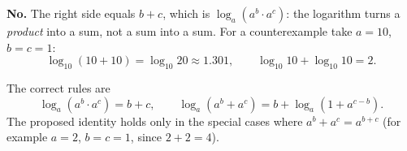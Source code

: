 \textbf{No.} The right side equals $b+c$, which is $\log_a\left(a^b\cdot a^c\right)$: the logarithm turns a \emph{product} into a sum, not a sum into a sum. For a counterexample take $a=10$, $b=c=1$:
\[
\log_{10}(10+10)=\log_{10}20\approx1.301,\qquad \log_{10}10+\log_{10}10=2 .
\]

The correct rules are
\[
\log_a\left(a^b\cdot a^c\right)=b+c,\qquad \log_a\left(a^b+a^c\right)=b+\log_a\left(1+a^{c-b}\right).
\]
The proposed identity holds only in the special cases where $a^b+a^c=a^{b+c}$ (for example $a=2$, $b=c=1$, since $2+2=4$).
